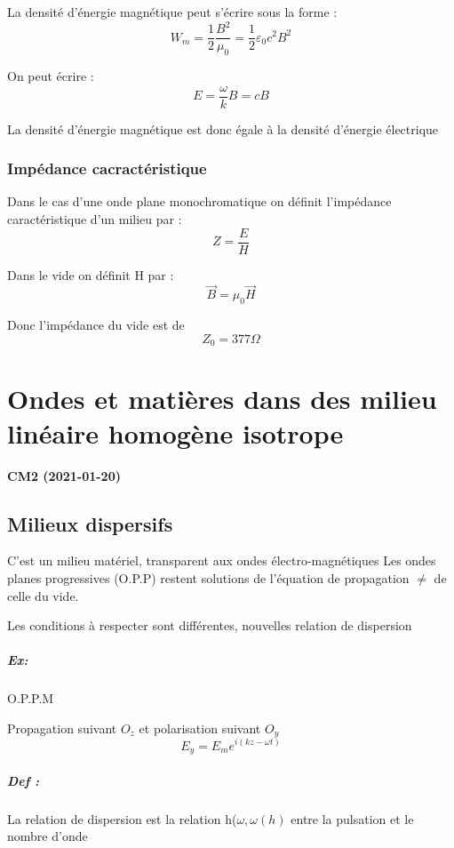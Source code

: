 \documentclass[12pt,a4paper]{report}
\begin{document}
La densité d'énergie magnétique peut s'écrire sous la forme :
\[
	W_m = \dfrac{1}{2} \dfrac{B^2}{\mu_0} = \dfrac{1}{2} \varepsilon_0 c^2 B^2
\]

On peut écrire :
\[
	E = \dfrac{\omega}{k} B = cB
\]

La densité d'énergie magnétique est donc égale à la densité d'énergie électrique

\subsection{Impédance cacractéristique}

Dans le cas d'une onde plane monochromatique on définit l'impédance caractéristique d'un milieu par :
\[
	Z = \dfrac{E}{H}
\]

Dans le vide on définit H par :
\[
	\vec{B} = \mu_0 \vec{H}
\]

Donc l'impédance du vide est de 
\[
	Z_0 = 377 \Omega
\]

\chapter{Ondes et matières dans des milieu linéaire homogène isotrope}

\begin{center}
\textbf{CM2 (2021-01-20)}
\end{center}

\section{Milieux dispersifs}

C'est un milieu matériel, transparent aux ondes électro-magnétiques
Les ondes planes progressives (O.P.P) restent solutions de l'équation de propagation \(\neq\) de celle du vide.

Les conditions à respecter sont différentes, nouvelles relation de dispersion

\paragraph{Ex:} O.P.P.M

Propagation suivant \(O_z\) et polarisation suivant \(O_y\)
\[
	E_y = E_m e^{i(kz-\omega t)}
\]

\paragraph{Def :}
La relation de dispersion est la relation h(\(\omega, \omega(h)\) entre la pulsation et le nombre d'onde
\end{document}

